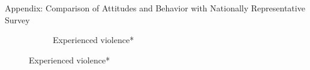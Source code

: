 \documentclass[10pt]{beamer}
\begin{document}
\begin{frame}{Appendix: Comparison of Attitudes and Behavior with Nationally Representative Survey}
\begin{figure}[H]
\begin{minipage}{0.8\textwidth}
\begin{subfigure}{0.5\textwidth}
    \caption{Experienced violence*} 
    \label{} 
  \end{subfigure} 
\end{minipage}
  \label{}
\end{figure}
    
\end{frame}
\end{document}

